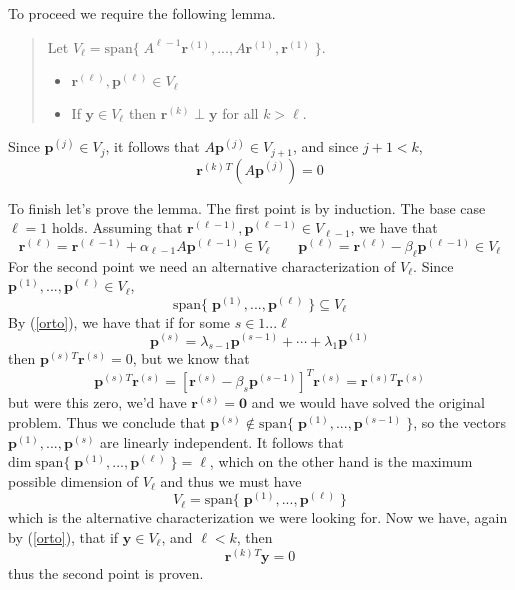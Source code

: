 \documentclass[12pt]{article}
\def\v#1{\mathbf{#1}}
\def\T{^{T}}
\def\con#1{^{(#1)}}
\def\sp#1{\mathrm{span}\{\; #1 \;\}}
\def\eqn#1#2{\begin{equation} \label{#1} #2 \end{equation}}
\def\dim{\mathrm{dim}\;}
\begin{document}
To proceed we require the following lemma.

\begin{quote}
Let $V_\ell = \sp{ A^{\ell-1} \v r \con 1, ..., A\v r \con 1, \v r \con 1 }$.
\begin{itemize}
\item $\v r \con \ell, \v p \con \ell \in V_{\ell}$
\item If $\v y \in V_\ell$ then $\v r \con k \perp \v y$ for all $k > \ell$.
\end{itemize}
\end{quote}

Since $\v p \con j \in V_j$, it follows that $A\v p \con j \in V_{j+1}$, and since $j + 1 < k$,
\eqn{}{\v r \con k {}\T (A \v p \con j) = 0}

To finish let's prove the lemma. The first point is by induction. The base case $\ell = 1$ holds. Assuming that $\v r \con{\ell - 1}, \v p \con {\ell - 1} \in V_{\ell - 1}$, we have that
\eqn{}{\v r \con \ell = \v r \con{\ell-1} + \alpha_{\ell-1} A \v p \con {\ell-1} \in V_{\ell} \qquad \v p \con \ell = \v r \con \ell - \beta_\ell \v p \con{\ell-1} \in V_\ell}
For the second point we need an alternative characterization of $V_\ell$. Since $\v p \con 1, ..., \v p \con \ell \in V_\ell$,
\eqn{}{\sp{ \v p \con 1, ..., \v p \con \ell } \subseteq V_\ell}
By (\ref{orto}), we have that if for some $s \in 1...\ell$
\eqn{}{\v p\con s = \lambda_{s-1} \v p \con{s-1} + \cdots + \lambda_{1} \v p \con 1}
then $\v p \con s {} \T \v r \con s = 0$, but we know that
\eqn{}{\v p \con s{}\T \v r \con s = [\v r \con s - \beta_s \v p \con {s-1}]\T \v r \con s = \v r \con s {}\T \v r \con s}
but were this zero, we'd have $\v r \con s = \v 0$ and we would have solved the original problem. Thus we conclude that $\v p \con s \not\in \sp{\v p \con 1, ..., \v p \con {s-1} }$, so the vectors $\v p \con 1, ..., \v p \con s$ are linearly independent. It follows that $\dim \sp{ \v p \con 1, ..., \v p \con \ell } = \ell$, which on the other hand is the maximum possible dimension of $V_\ell$ and thus we must have
\eqn{}{V_\ell = \sp{ \v p \con 1, ..., \v p \con \ell }}
which is the alternative characterization we were looking for.
Now we have, again by (\ref{orto}), that if $\v y \in V_\ell$, and $\ell < k$, then
\eqn{}{\v r \con k {}\T \v y = 0}
thus the second point is proven.
\end{document}
